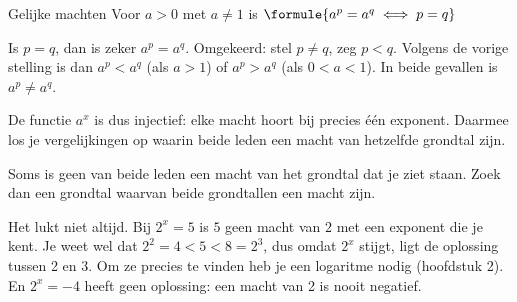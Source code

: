 \begin{theorie}
\begin{stelling}{Gelijke machten}
Voor $a > 0$ met $a \neq 1$ is \qquad $\formule{a^p = a^q \iff p = q}$
\end{stelling}
\begin{bewijs}
Is $p = q$, dan is zeker $a^p = a^q$. Omgekeerd: stel $p \neq q$, zeg $p < q$. Volgens de vorige stelling is dan $a^p < a^q$ (als $a > 1$) of $a^p > a^q$ (als $0 < a < 1$). In beide gevallen is $a^p \neq a^q$.
\end{bewijs}
\end{theorie}

De functie $a^x$ is dus injectief: elke macht hoort bij precies één exponent. Daarmee los je vergelijkingen op waarin beide leden een macht van hetzelfde grondtal zijn.


Soms is geen van beide leden een macht van het grondtal dat je ziet staan. Zoek dan een grondtal waarvan beide grondtallen een macht zijn.


Het lukt niet altijd. Bij $2^x = 5$ is $5$ geen macht van $2$ met een exponent die je kent. Je weet wel dat $2^2 = 4 < 5 < 8 = 2^3$, dus omdat $2^x$ stijgt, ligt de oplossing tussen 2 en 3. Om ze precies te vinden heb je een logaritme nodig (hoofdstuk 2). En $2^x = -4$ heeft geen oplossing: een macht van 2 is nooit negatief.

